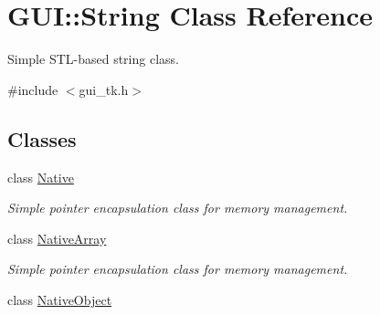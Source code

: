 \hypertarget{classGUI_1_1String}{\section{G\-U\-I\-:\-:String Class Reference}
\label{classGUI_1_1String}
}


Simple S\-T\-L-\/based string class.  




{\ttfamily \#include $<$gui\-\_\-tk.\-h$>$}

\subsection*{Classes}
\begin{DoxyCompactItemize}
\item 
class \hyperlink{classGUI_1_1String_1_1Native}{Native}
\begin{DoxyCompactList}\small\item\em Simple pointer encapsulation class for memory management. \end{DoxyCompactList}\item 
class \hyperlink{classGUI_1_1String_1_1NativeArray}{Native\-Array}
\begin{DoxyCompactList}\small\item\em Simple pointer encapsulation class for memory management. \end{DoxyCompactList}\item 
class \hyperlink{classGUI_1_1String_1_1NativeObject}{Native\-Object}
\end{DoxyCompactItemize}
